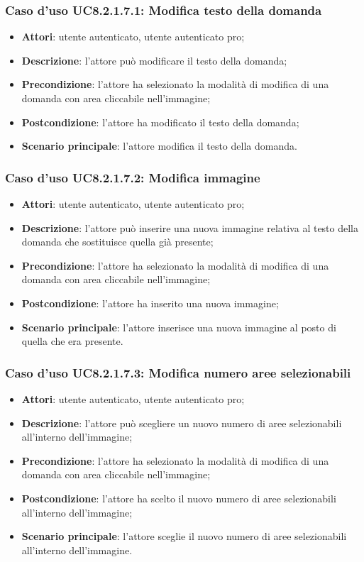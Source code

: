 \subsubsection{Caso d'uso UC8.2.1.7.1: Modifica testo della domanda}
\begin{itemize}
	\item \textbf{Attori}: utente autenticato, utente autenticato pro;
	\item \textbf{Descrizione}: l'attore può modificare il testo della domanda;
	\item \textbf{Precondizione}: l'attore ha selezionato la modalità di modifica di una domanda con area cliccabile nell'immagine; 
	\item \textbf{Postcondizione}: l'attore ha modificato il testo della domanda;
	\item \textbf{Scenario principale}: l'attore modifica il testo della domanda. 
\end{itemize}

\subsubsection{Caso d'uso UC8.2.1.7.2: Modifica immagine}
\begin{itemize}
	\item \textbf{Attori}: utente autenticato, utente autenticato pro;
	\item \textbf{Descrizione}: l'attore può inserire una nuova immagine relativa al testo della domanda che sostituisce quella già presente;
	\item \textbf{Precondizione}: l'attore ha selezionato la modalità di modifica di una domanda con area cliccabile nell'immagine;  
	\item \textbf{Postcondizione}: l'attore ha inserito una nuova immagine;
	\item \textbf{Scenario principale}: l'attore inserisce una nuova immagine al posto di quella che era presente. 	
\end{itemize}

\subsubsection{Caso d'uso UC8.2.1.7.3: Modifica numero aree selezionabili}
\begin{itemize}
	\item \textbf{Attori}: utente autenticato, utente autenticato pro;
	\item \textbf{Descrizione}: l'attore può scegliere un nuovo numero di aree selezionabili all'interno dell'immagine;
	\item \textbf{Precondizione}: l'attore ha selezionato la modalità di modifica di una domanda con area cliccabile nell'immagine; 
	\item \textbf{Postcondizione}: l'attore ha scelto il nuovo numero di aree selezionabili all'interno dell'immagine;
	\item \textbf{Scenario principale}: l'attore sceglie il nuovo numero di aree selezionabili all'interno dell'immagine. 	
\end{itemize}

